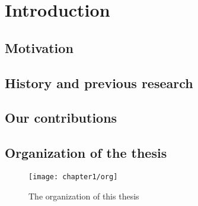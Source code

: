 \chapter{Introduction}
\label{chap:intro}

\lipsum[2-4]


\section{Motivation}
\label{sec:motivation}

\lipsum[5-8]

\section{History and previous research}
\label{sec:history}

\lipsum[9-12]

\section{Our contributions}
\label{sec:contribution}

\lipsum[13-16]

\section{Organization of the thesis}
\label{sec:organization}

\lipsum[17]

\begin{figure}
  \centering
  \texttt{[image: chapter1/org]}
  \caption{The organization of this thesis}
  \label{fig:organization-1}
\end{figure}

\lipsum[18]
